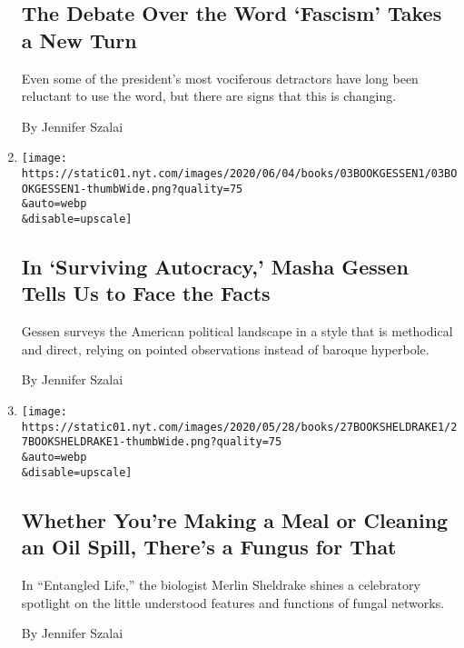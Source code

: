 \begin{enumerate}
  \hypertarget{the-debate-over-the-word-fascism-takes-a-new-turn}{%
  \subsection{The Debate Over the Word `Fascism' Takes a New
  Turn}\label{the-debate-over-the-word-fascism-takes-a-new-turn}}

  Even some of the president's most vociferous detractors have long been
  reluctant to use the word, but there are signs that this is changing.

  By Jennifer Szalai
\item
  \href{/2020/06/03/books/review-surviving-autocracy-masha-gessen.html}{}

  \texttt{[image: https://static01.nyt.com/images/2020/06/04/books/03BOOKGESSEN1/03BOOKGESSEN1-thumbWide.png?quality=75\\\&auto=webp\\\&disable=upscale]}

  \hypertarget{in-surviving-autocracy-masha-gessen-tells-us-to-face-the-facts}{%
  \subsection{In `Surviving Autocracy,' Masha Gessen Tells Us to Face
  the
  Facts}\label{in-surviving-autocracy-masha-gessen-tells-us-to-face-the-facts}}

  Gessen surveys the American political landscape in a style that is
  methodical and direct, relying on pointed observations instead of
  baroque hyperbole.

  By Jennifer Szalai
\item
  \href{/2020/05/27/books/review-entangled-life-fungi-merlin-sheldrake.html}{}

  \texttt{[image: https://static01.nyt.com/images/2020/05/28/books/27BOOKSHELDRAKE1/27BOOKSHELDRAKE1-thumbWide.png?quality=75\\\&auto=webp\\\&disable=upscale]}

  \hypertarget{whether-youre-making-a-meal-or-cleaning-an-oil-spill-theres-a-fungus-for-that}{%
  \subsection{Whether You're Making a Meal or Cleaning an Oil Spill,
  There's a Fungus for
  That}\label{whether-youre-making-a-meal-or-cleaning-an-oil-spill-theres-a-fungus-for-that}}

  In ``Entangled Life,'' the biologist Merlin Sheldrake shines a
  celebratory spotlight on the little understood features and functions
  of fungal networks.

  By Jennifer Szalai
\end{enumerate}

